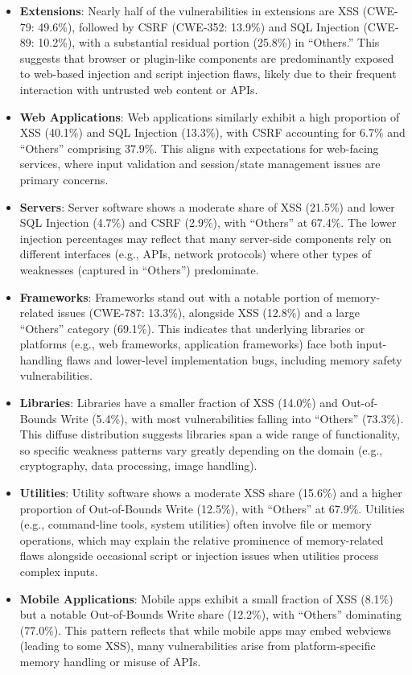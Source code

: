 \begin{itemize}
    \item \textbf{Extensions}: Nearly half of the vulnerabilities in extensions are XSS (CWE-79: 49.6\%), followed by CSRF (CWE-352: 13.9\%) and SQL Injection (CWE-89: 10.2\%), with a substantial residual portion (25.8\%) in “Others.” This suggests that browser or plugin-like components are predominantly exposed to web-based injection and script injection flaws, likely due to their frequent interaction with untrusted web content or APIs.
    \item \textbf{Web Applications}: Web applications similarly exhibit a high proportion of XSS (40.1\%) and SQL Injection (13.3\%), with CSRF accounting for 6.7\% and “Others” comprising 37.9\%. This aligns with expectations for web-facing services, where input validation and session/state management issues are primary concerns.
    \item \textbf{Servers}: Server software shows a moderate share of XSS (21.5\%) and lower SQL Injection (4.7\%) and CSRF (2.9\%), with “Others” at 67.4\%. The lower injection percentages may reflect that many server-side components rely on different interfaces (e.g., APIs, network protocols) where other types of weaknesses (captured in “Others”) predominate.
    \item \textbf{Frameworks}: Frameworks stand out with a notable portion of memory-related issues (CWE-787: 13.3\%), alongside XSS (12.8\%) and a large “Others” category (69.1\%). This indicates that underlying libraries or platforms (e.g., web frameworks, application frameworks) face both input-handling flaws and lower-level implementation bugs, including memory safety vulnerabilities.
    \item \textbf{Libraries}: Libraries have a smaller fraction of XSS (14.0\%) and Out-of-Bounds Write (5.4\%), with most vulnerabilities falling into “Others” (73.3\%). This diffuse distribution suggests libraries span a wide range of functionality, so specific weakness patterns vary greatly depending on the domain (e.g., cryptography, data processing, image handling).
    \item \textbf{Utilities}: Utility software shows a moderate XSS share (15.6\%) and a higher proportion of Out-of-Bounds Write (12.5\%), with “Others” at 67.9\%. Utilities (e.g., command-line tools, system utilities) often involve file or memory operations, which may explain the relative prominence of memory-related flaws alongside occasional script or injection issues when utilities process complex inputs.
    \item \textbf{Mobile Applications}: Mobile apps exhibit a small fraction of XSS (8.1\%) but a notable Out-of-Bounds Write share (12.2\%), with “Others” dominating (77.0\%). This pattern reflects that while mobile apps may embed webviews (leading to some XSS), many vulnerabilities arise from platform-specific memory handling or misuse of APIs.
\end{itemize}

